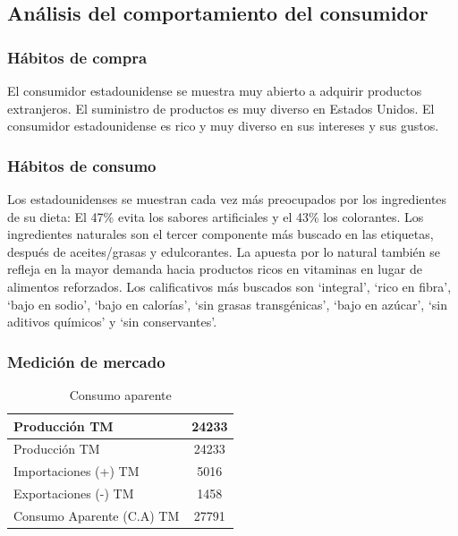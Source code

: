 \documentclass[
  stu,
  floatsintext,
  longtable,
  a4paper,
  nolmodern,
  notxfonts,
  notimes,
  colorlinks=true,linkcolor=blue,citecolor=blue,urlcolor=blue]{apa7}
\begin{document}
\subsection{Análisis del comportamiento del
consumidor}\label{anuxe1lisis-del-comportamiento-del-consumidor}

\subsubsection{Hábitos de compra}\label{huxe1bitos-de-compra}

El consumidor estadounidense se muestra muy abierto a adquirir productos
extranjeros. El suministro de productos es muy diverso en Estados
Unidos. El consumidor estadounidense es rico y muy diverso en sus
intereses y sus gustos.

\subsubsection{Hábitos de consumo}\label{huxe1bitos-de-consumo}

Los estadounidenses se muestran cada vez más preocupados por los
ingredientes de su dieta: El 47\% evita los sabores artificiales y el
43\% los colorantes. Los ingredientes naturales son el tercer componente
más buscado en las etiquetas, después de aceites/grasas y edulcorantes.
La apuesta por lo natural también se refleja en la mayor demanda hacia
productos ricos en vitaminas en lugar de alimentos reforzados. Los
calificativos más buscados son `integral', `rico en fibra', `bajo en
sodio', `bajo en calorías', `sin grasas transgénicas', `bajo en azúcar',
`sin aditivos químicos' y `sin conservantes'.

\subsubsection{Medición de mercado}\label{mediciuxf3n-de-mercado}

\begin{longtable}[]{@{}lc@{}}
\caption{Consumo aparente}\tabularnewline
\toprule\noalign{}
Producción TM & 24233 \\
\midrule\noalign{}
\endfirsthead
\toprule\noalign{}
Producción TM & 24233 \\
\midrule\noalign{}
\endhead
\bottomrule\noalign{}
\endlastfoot
Importaciones (+) TM & 5016 \\
Exportaciones (-) TM & 1458 \\
Consumo Aparente (C.A) TM & 27791 \\
\end{longtable}
\end{document}
